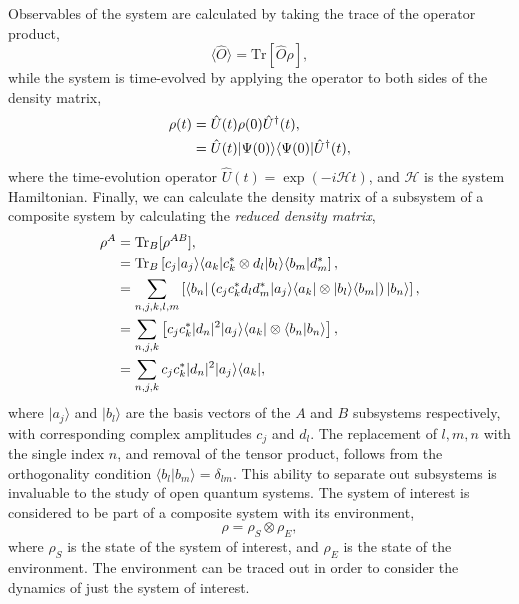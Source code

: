 Observables of the system are calculated by taking the trace of the operator product,
\begin{equation}
	\langle \hat{O} \rangle = \mathrm{Tr}[\hat{O}\rho],
	\label{eq:oqs2-5}
\end{equation}
while the system is time-evolved by applying the operator to both sides of the density matrix,
\begin{align}
	\rho (t) &= \hat{U}(t) \rho(0) \hat{U}^{\dagger}(t), \notag \\
	&= \hat{U}(t) | \Psi(0) \rangle \langle \Psi(0) | \hat{U}^{\dagger}(t),
	\label{eq:oqs2-6}
\end{align}  
where the time-evolution operator \(\hat{U}(t) = \exp(-i\mathcal{H}t)\), and \(\mathcal{H}\) is the system Hamiltonian. Finally, we can calculate the density matrix of a subsystem of a composite system by calculating the \emph{reduced density matrix},
\begin{align}
	\rho^{A} &= \mathrm{Tr}_{B}[\rho^{AB}], \notag \\
	&= \mathrm{Tr}_{B}\left[ c_{j}|a_{j} \rangle \langle a_{k}|c_{k}^{*} \otimes d_{l}|b_{l} \rangle \langle b_{m}|d_{m}^{*} \right], \notag \\
	&= \sum_{n,j,k,l,m}\left[ \langle b_{n} | \left( c_{j}c_{k}^{*}d_{l}d_{m}^{*} |a_{j} \rangle \langle a_{k}| \otimes |b_{l} \rangle \langle b_{m}| \right) | b_{n} \rangle \right], \notag \\ 
	&= \sum_{n,j,k} \left[ c_{j}c_{k}^{*}|d_{n}|^{2} |a_{j} \rangle \langle a_{k}| \otimes \langle b_{n} | b_{n} \rangle \right], \notag \\
	&= \sum_{n,j,k} c_{j}c_{k}^{*}|d_{n}|^{2} |a_{j} \rangle \langle a_{k}|,
	\label{eq:oqs2-7}
\end{align}
where \(|a_{j} \rangle\) and \(|b_{l} \rangle\) are the basis vectors of the \(A\) and \(B\) subsystems respectively, with corresponding complex amplitudes \(c_{j}\) and \(d_{l}\). The replacement of \(l,m,n\) with the single index \(n\), and removal of the tensor product, follows from the orthogonality condition \(\langle b_{l} | b_{m} \rangle = \delta_{lm}\). This ability to separate out subsystems is invaluable to the study of open quantum systems. The system of interest is considered to be part of a composite system with its environment,
\begin{equation}
	\rho = \rho_{S} \otimes \rho_{E},
	\label{eq:oqs2-8}
\end{equation}
where \(\rho_{S}\) is the state of the system of interest, and \(\rho_{E}\) is the state of the environment. The environment can be traced out in order to consider the dynamics of just the system of interest. 


